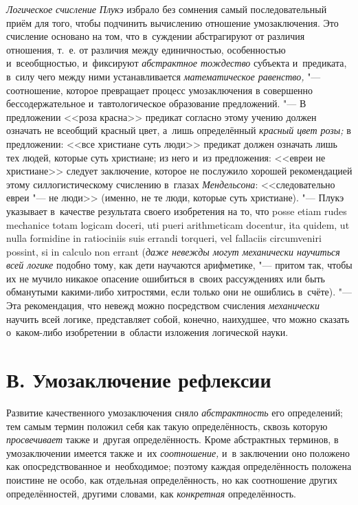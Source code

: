 {\em Логическое счисление Плукэ}
избрало без сомнения самый последовательный приём для того,
чтобы подчинить вычислению отношение умозаключения. Это счисление основано
на том, что в~суждении абстрагируют от различия отношения, т.~е. от
различия между единичностью, особенностью и~всеобщностью, и~фиксируют
{\em абстрактное тождество}
субъекта и~предиката, в~силу чего между ними устанавливается
{\em математическое равенство,} "---
соотношение, которое превращает процесс умозаключения в
совершенно бессодержательное и~тавтологическое образование предложений. "---
В предложении <<роза красна>> предикат согласно этому учению
должен означать не всеобщий красный цвет, а~лишь определённый
{\em красный цвет розы;}
в предложении: <<все христиане суть люди>> предикат должен
означать лишь тех людей, которые суть христиане; из него и~из предложения:
<<евреи не христиане>> следует заключение, которое не послужило хорошей
рекомендацией этому силлогистическому счислению в~глазах
{\em Мендельсона}:
<<следовательно евреи "--- не люди>> (именно, не те
люди, которые суть христиане). "--- Плукэ указывает в~качестве
результата своего изобретения на то, что posse etiam rudes mechanice totam
logicam doceri, uti pueri arithme\-ticam docentur, ita quidem, ut nulla
formidine in ratiociniis suis errandi torqueri, vel fallaciis circum\-veniri
possint, si in calculo non errant
({\em даже невежды могут механически
научиться всей логике} подобно тому, как дети научаются
арифметике, "--- притом так, чтобы их не мучило никакое
опасение ошибиться в~своих рассуждениях или быть обманутыми какими-либо
хитростями, если только они не ошиблись в~счёте). "--- Эта
рекомендация, что невежд можно посредством счисления
{\em механически} научить
всей логике, представляет собой, конечно, наихудшее, что
можно сказать о~каком-либо изобретении в~области изложения логической
науки.

\section[В. Умозаключение рефлексии]{В. Умозаключение рефлексии}

Развитие качественного умозаключения сняло
{\em абстрактность} его
определений; тем самым термин положил себя как такую определённость, сквозь
которую {\em просвечивает}
также и~другая определённость. Кроме абстрактных терминов, в
умозаключении имеется также и~их
{\em соотношение,} и~в
заключении оно положено как опосредствованное и~необходимое; поэтому каждая
определённость положена поистине не особо, как отдельная определённость, но
как соотношение других определённостей, другими словами, как
{\em конкретная} определённость.

